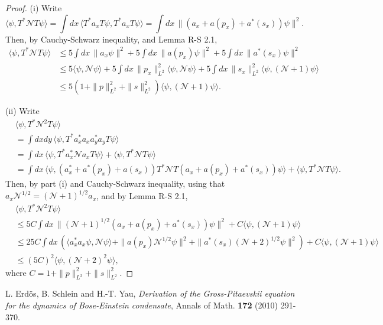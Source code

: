 \documentclass[a4paper,11pt]{article}
\newcommand{\N}{\mathcal{N}}
\begin{document}
\begin{proof}
  (i) Write
  \begin{displaymath}
    \langle \psi, T^* \N T \psi \rangle = \int dx \, \langle T^* a_x T \psi,
    T^* a_x T \psi \rangle = \int dx \, \| (a_x + a(p_x) + a^*(s_x)) \psi
    \|^2.
  \end{displaymath}
  Then, by Cauchy-Schwarz inequality, and Lemma R-S 2.1,
  \begin{align*}
    \langle \psi, T^* \N T \psi \rangle & \le 5 \int dx \, \| a_x \psi \|^2 +
    5 \int dx \, \| a(p_x) \psi \|^2 + 5 \int dx \, \| a^*(s_x) \psi \|^2 \\
    & \le 5 \langle \psi, \N \psi \rangle + 5 \int dx \, \| p_x \|_{L^2}^2
    \langle \psi, \N \psi \rangle + 5 \int dx \, \| s_x \|_{L^2}^2 \langle
    \psi, (\N+1) \psi \rangle \\
    & \le 5 (1 + \| p \|_{L^2}^2 + \| s \|_{L^2}^2) \langle \psi, (\N+1) \psi
    \rangle.
  \end{align*}


  (ii) Write
  \begin{align*}
    & \langle \psi, T^* \N^2 T \psi \rangle \\
    & = \int dxdy \, \langle \psi, T^* a_x^* a_x a_y^* a_y T \psi \rangle \\
    & = \int dx \, \langle \psi, T^* a_x^* \N a_x T \psi \rangle + \langle
    \psi, T^* \N T \psi \rangle \\
    & = \int dx \, \langle \psi, (a_x^* + a^*(p_x) + a(s_x)) T^* \N T (a_x +
    a(p_x) + a^*(s_x)) \psi \rangle + \langle \psi, T^* \N T \psi \rangle.
  \end{align*}
  Then, by part (i) and Cauchy-Schwarz inequality, using that $a_x \N^{1/2} =
  (\N+1)^{1/2} a_x$, and by Lemma R-S 2.1,
  \begin{align*}
    & \langle \psi, T^* \N^2 T \psi \rangle \\
    & \le 5C \int dx \, \| (\N+1)^{1/2} (a_x + a(p_x) + a^*(s_x)) \psi \|^2 + C
    \langle \psi, (\N+1) \psi \rangle \\
    & \le 25C \int dx \, ( \langle a_x^* a_x \psi, \N \psi \rangle + \| a(p_x)
    \N^{1/2} \psi \|^2 + \| a^*(s_x) (\N+2)^{1/2} \psi \|^2 ) + C \langle
    \psi, (\N+1) \psi \rangle \\
    & \le (5C)^2 \langle \psi, (\N+2)^2 \psi \rangle,
  \end{align*}
  where $C = 1 + \| p \|_{L^2}^2 + \| s \|_{L^2}^2$.
\end{proof}


\begin{thebibliography}{99}
   L. Erd\"os, B. Schlein and H.-T. Yau, \emph{Derivation of the
    Gross-Pitaevskii equation for the dynamics of Bose-Einstein condensate},
    Annals of Math. {\bf 172} (2010) 291-370.
\end{thebibliography}
\end{document}
